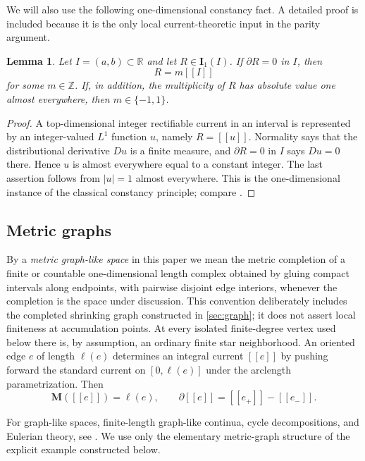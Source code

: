 \documentclass[11pt]{article}
\newtheorem{lemma}[theorem]{Lemma}
\theoremstyle{remark}
\newcommand{\M}{\mathbf M}
\newcommand{\I}{\mathbf I}
\newcommand{\llbracket}{[\![}
\newcommand{\rrbracket}{]\!]}
\begin{document}
We will also use the following one-dimensional constancy fact. A detailed proof is included because it is the only local current-theoretic input in the parity argument.

\begin{lemma}\label{lem:interval}
Let $I=(a,b)\subset\mathbb R$ and let $R\in\I_1(I)$. If $\partial R=0$ in $I$, then
\[
      R=m\llbracket I\rrbracket
\]
for some $m\in\mathbb Z$. If, in addition, the multiplicity of $R$ has absolute value one almost everywhere, then $m\in\{-1,1\}$.
\end{lemma}

\begin{proof}
A top-dimensional integer rectifiable current in an interval is represented by an integer-valued $L^1$ function $u$, namely $R=\llbracket u\rrbracket$. Normality says that the distributional derivative $Du$ is a finite measure, and $\partial R=0$ in $I$ says $Du=0$ there. Hence $u$ is almost everywhere equal to a constant integer. The last assertion follows from $|u|=1$ almost everywhere. This is the one-dimensional instance of the classical constancy principle; compare \cite{Federer69,AK00,Smirnov94,PaoliniStepanov13,BDP22}.
\end{proof}

\subsection{Metric graphs}

By a \emph{metric graph-like space} in this paper we mean the metric completion of a finite or countable one-dimensional length complex obtained by gluing compact intervals along endpoints, with pairwise disjoint edge interiors, whenever the completion is the space under discussion. This convention deliberately includes the completed shrinking graph constructed in \cref{sec:graph}; it does not assert local finiteness at accumulation points. At every isolated finite-degree vertex used below there is, by assumption, an ordinary finite star neighborhood. An oriented edge $e$ of length $\ell(e)$ determines an integral current $\llbracket e\rrbracket$ by pushing forward the standard current on $[0,\ell(e)]$ under the arclength parametrization. Then
\[
  \M(\llbracket e\rrbracket)=\ell(e),
  \qquad
  \partial\llbracket e\rrbracket
  =\llbracket e_+\rrbracket-\llbracket e_-\rrbracket.
\]

For graph-like spaces, finite-length graph-like continua, cycle decompositions, and Eulerian theory, see \cite{ThomassenVella08,Richter11,Georgakopoulos12,Georgakopoulos14,EspinozaGartsidePitz20,GartsidePitz23}. We use only the elementary metric-graph structure of the explicit example constructed below.
\end{document}
